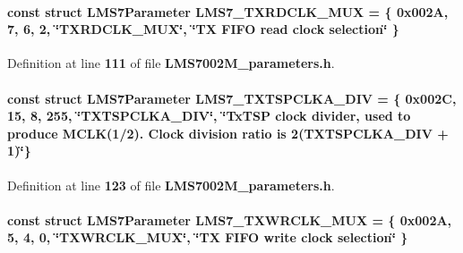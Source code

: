 \paragraph[{L\+M\+S7\+\_\+\+T\+X\+R\+D\+C\+L\+K\+\_\+\+M\+UX}]{\setlength{\rightskip}{0pt plus 5cm}const struct {\bf L\+M\+S7\+Parameter} L\+M\+S7\+\_\+\+T\+X\+R\+D\+C\+L\+K\+\_\+\+M\+UX = \{ 0x002\+A, 7, 6, 2, \char`\"{}\+T\+X\+R\+D\+C\+L\+K\+\_\+\+M\+U\+X\char`\"{}, \char`\"{}\+T\+X F\+I\+F\+O read clock selection\char`\"{} \}\hspace{0.3cm}{\ttfamily [static]}}\label{LMS7002M__parameters_8h_ac1f20f33ddaf10e23dff0ca877856c9d}


Definition at line {\bf 111} of file {\bf L\+M\+S7002\+M\+\_\+parameters.\+h}.

\paragraph[{L\+M\+S7\+\_\+\+T\+X\+T\+S\+P\+C\+L\+K\+A\+\_\+\+D\+IV}]{\setlength{\rightskip}{0pt plus 5cm}const struct {\bf L\+M\+S7\+Parameter} L\+M\+S7\+\_\+\+T\+X\+T\+S\+P\+C\+L\+K\+A\+\_\+\+D\+IV = \{ 0x002\+C, 15, 8, 255, \char`\"{}\+T\+X\+T\+S\+P\+C\+L\+K\+A\+\_\+\+D\+I\+V\char`\"{}, \char`\"{}\+Tx\+T\+S\+P clock divider, used to produce M\+C\+L\+K(1/2). Clock division ratio is 2(\+T\+X\+T\+S\+P\+C\+L\+K\+A\+\_\+\+D\+I\+V + 1)\char`\"{}\}\hspace{0.3cm}{\ttfamily [static]}}\label{LMS7002M__parameters_8h_afefc9b406def36f39a88d3e044590851}


Definition at line {\bf 123} of file {\bf L\+M\+S7002\+M\+\_\+parameters.\+h}.

\paragraph[{L\+M\+S7\+\_\+\+T\+X\+W\+R\+C\+L\+K\+\_\+\+M\+UX}]{\setlength{\rightskip}{0pt plus 5cm}const struct {\bf L\+M\+S7\+Parameter} L\+M\+S7\+\_\+\+T\+X\+W\+R\+C\+L\+K\+\_\+\+M\+UX = \{ 0x002\+A, 5, 4, 0, \char`\"{}\+T\+X\+W\+R\+C\+L\+K\+\_\+\+M\+U\+X\char`\"{}, \char`\"{}\+T\+X F\+I\+F\+O write clock selection\char`\"{} \}\hspace{0.3cm}{\ttfamily [static]}}\label{LMS7002M__parameters_8h_a278b7681c5c31bc43d84491ea0e3cfbb}


